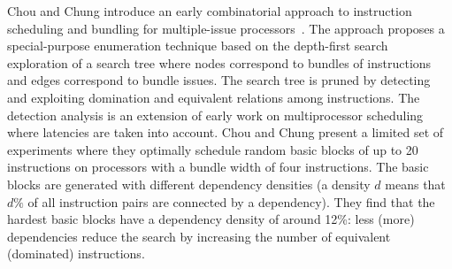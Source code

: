 \documentclass[acmsmall,authorversion,nonacm]{acmart}
\begin{document}
Chou and Chung introduce an early combinatorial approach to
instruction scheduling and bundling for multiple-issue
processors~\cite{Chou1995}.
The approach proposes a special-purpose enumeration technique based on
the depth-first search exploration of a search tree where nodes
correspond to bundles of instructions and edges correspond to bundle
issues.
The search tree is pruned by detecting and exploiting domination and
equivalent relations among instructions.
The detection analysis is an extension of early work on multiprocessor
scheduling~\cite{Ramamoorthy1972} where latencies are taken into
account.
Chou and Chung present a limited set of experiments where they
optimally schedule random basic blocks of up to 20 instructions on
processors with a bundle width of four instructions.
The basic blocks are generated with different dependency densities (a
density $d$ means that $d\%$ of all instruction pairs are connected by
a dependency).
They find that the hardest basic blocks have a dependency density of
around 12\%: less (more) dependencies reduce the search by
increasing the number of equivalent (dominated) instructions.
\end{document}
